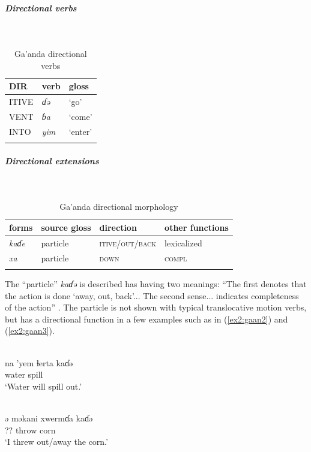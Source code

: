 \subparagraph{Directional verbs}~

\begin{table}[H]
	\caption{Ga'anda directional verbs} 
	\label{tab:gaanV}
	\begin{tabular}{lll} %
		\lsptoprule
		DIR & verb & gloss   \\ %
		\midrule
		ITIVE & \textit{ɗə} & `go' \\
		VENT & \textit{ɓa} & `come' \\
		INTO& \textit{yim} & `enter' \\
		\lspbottomrule
	\end{tabular}
\end{table}

\subparagraph{Directional extensions}~

\begin{table}[H]
	\caption{Ga'anda directional morphology}
	\label{tab:gaan}
	\begin{tabular}{llll} %
		\lsptoprule
		forms & source gloss & direction  & other functions  \\ %
		\midrule
		\textit{kaɗe}  &  particle  &    \textsc{itive/out/back} &  lexicalized \\
		\textit{xa}  &  particle  & \textsc{down}   &  \textsc{compl}  \\
		\lspbottomrule
	\end{tabular}
\end{table} 

The ``particle'' \textit{kaɗə} is described has having two meanings: ``The first denotes that the action is done `away, out, back'... The second sense... indicates completeness of the action'' \citep[184--185]{newmanCaseGrammarGa1971}. The particle is not shown with typical translocative motion verbs, but has a directional function in a few examples such as in (\ref{ex2:gaan2}) and (\ref{ex2:gaan3}). 

\ea\label{ex2:gaan2}
 \\
\gll na 'yem ɬerta kaɗə	\\
 water spill  \\
\glt `Water will spill out.'

\ex\label{ex2:gaan3}
 \\
\gll  ə məkani xwermɗa kaɗə		\\
?? throw corn  \\
\glt `I threw out/away the corn.'
\z 

